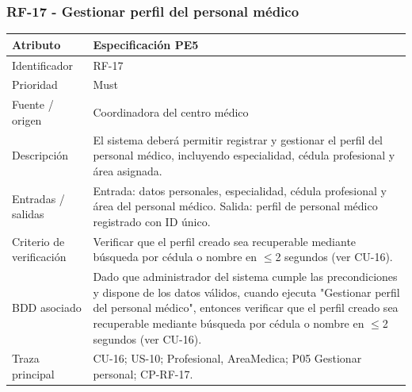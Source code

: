 \documentclass[11pt,a4paper]{article}
\begin{document}
	\subsubsection{RF-17 - Gestionar perfil del personal médico}
	\begin{tabularx}{\textwidth}{p{3.2cm}Y}
		\toprule
		\textbf{Atributo} & \textbf{Especificación PE5}\\\midrule
		Identificador & RF-17\\
		Prioridad & Must\\
		Fuente / origen & Coordinadora del centro médico\\
		Descripción & El sistema deberá permitir registrar y gestionar el perfil del personal médico, incluyendo especialidad, cédula profesional y área asignada.\\
		Entradas / salidas & Entrada: datos personales, especialidad, cédula profesional y área del personal médico. Salida: perfil de personal médico registrado con ID único.\\
		Criterio de verificación & Verificar que el perfil creado sea recuperable mediante búsqueda por cédula o nombre en $\leq$2 segundos (ver CU-16).\\
		BDD asociado & Dado que administrador del sistema cumple las precondiciones y dispone de los datos válidos, cuando ejecuta "Gestionar perfil del personal médico", entonces verificar que el perfil creado sea recuperable mediante búsqueda por cédula o nombre en $\leq$2 segundos (ver CU-16).\\
		Traza principal & CU-16; US-10; Profesional, AreaMedica; P05 Gestionar personal; CP-RF-17.\\
		\bottomrule
	\end{tabularx}
\end{document}
